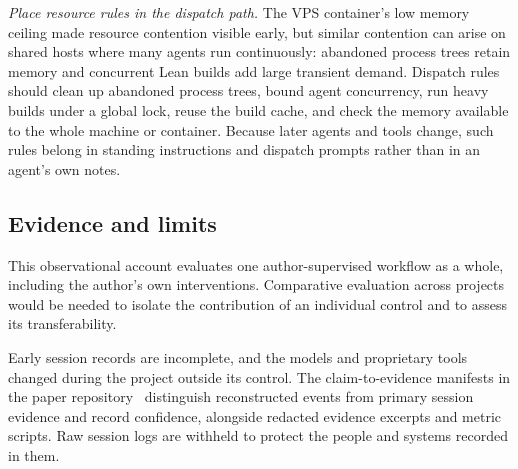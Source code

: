 \emph{Place resource rules in the dispatch path.}
The VPS container's low memory ceiling made resource contention visible
early, but similar contention can arise on shared hosts where many agents
run continuously: abandoned process trees retain memory and concurrent
Lean builds add large transient demand. Dispatch rules should clean up
abandoned process trees, bound agent concurrency, run heavy builds under a
global lock, reuse the build cache, and check the memory available to the
whole machine or container. Because later agents and tools change, such rules belong in standing
instructions and dispatch prompts rather than in an agent's own notes. %

\subsection{Evidence and limits}

This observational account evaluates one author-supervised workflow as a
whole, including the author's own interventions. Comparative evaluation
across projects would be needed to isolate the contribution of an
individual control and to assess its transferability.

Early session records are incomplete, and the models and proprietary
tools changed during the project outside its control. The claim-to-evidence
manifests in the paper repository~\cite{kse2026repo} distinguish
reconstructed events from primary session evidence and record confidence,
alongside redacted evidence excerpts and metric scripts. Raw session logs
are withheld to protect the people and systems recorded in them.
